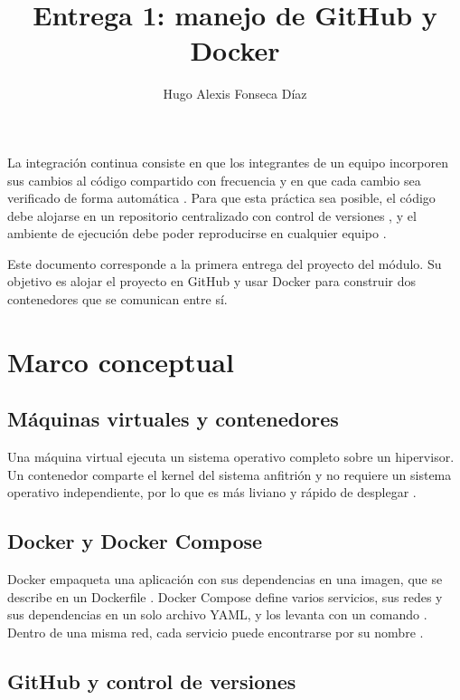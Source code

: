 \documentclass[stu,a4paper,floatsintext]{apa7}
\title{Entrega 1: manejo de GitHub y Docker}
\author{Hugo Alexis Fonseca Díaz}
\begin{document}
\maketitle

La integración continua consiste en que los integrantes de un equipo incorporen sus cambios al código compartido con frecuencia y en que cada cambio sea verificado de forma automática \parencite{fowler2006, oliveros_fundamentos}. Para que esta práctica sea posible, el código debe alojarse en un repositorio centralizado con control de versiones \parencite{oliveros_repositorios}, y el ambiente de ejecución debe poder reproducirse en cualquier equipo \parencite{oliveros_maquinas}.

Este documento corresponde a la primera entrega del proyecto del módulo. Su objetivo es alojar el proyecto en GitHub y usar Docker para construir dos contenedores que se comunican entre sí.

\newpage
\section{Marco conceptual}

\subsection{Máquinas virtuales y contenedores}

Una máquina virtual ejecuta un sistema operativo completo sobre un hipervisor. Un contenedor comparte el kernel del sistema anfitrión y no requiere un sistema operativo independiente, por lo que es más liviano y rápido de desplegar \parencite{oliveros_maquinas}.

\subsection{Docker y Docker Compose}

Docker empaqueta una aplicación con sus dependencias en una imagen, que se describe en un Dockerfile \parencite{dockerinc_dockerfile}. Docker Compose define varios servicios, sus redes y sus dependencias en un solo archivo YAML, y los levanta con un comando \parencite{dockerinc_compose}. Dentro de una misma red, cada servicio puede encontrarse por su nombre \parencite{dockerinc_networking}.

\subsection{GitHub y control de versiones}
\end{document}
